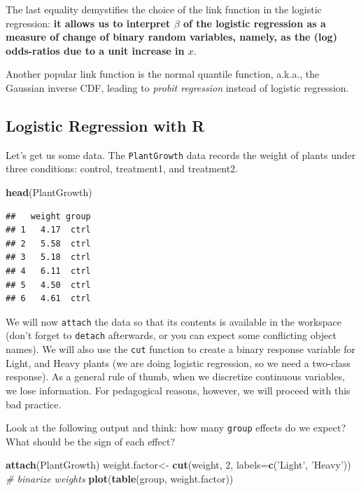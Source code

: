 \documentclass[]{book}
\newenvironment{Shaded}{\begin{snugshade}}{\end{snugshade}}
\newcommand{\KeywordTok}[1]{\textcolor[rgb]{0.13,0.29,0.53}{\textbf{#1}}}
\newcommand{\DataTypeTok}[1]{\textcolor[rgb]{0.13,0.29,0.53}{#1}}
\newcommand{\DecValTok}[1]{\textcolor[rgb]{0.00,0.00,0.81}{#1}}
\newcommand{\StringTok}[1]{\textcolor[rgb]{0.31,0.60,0.02}{#1}}
\newcommand{\CommentTok}[1]{\textcolor[rgb]{0.56,0.35,0.01}{\textit{#1}}}
\newcommand{\NormalTok}[1]{#1}
\theoremstyle{definition}
\theoremstyle{definition}
\theoremstyle{definition}
\theoremstyle{remark}
\let\BeginKnitrBlock\begin \let\EndKnitrBlock\end
\begin{document}
The last equality demystifies the choice of the link function in the
logistic regression: \textbf{it allows us to interpret \(\beta\) of the
logistic regression as a measure of change of binary random variables,
namely, as the (log) odds-ratios due to a unit increase in \(x\)}.

\BeginKnitrBlock{remark}
{}Another popular link function is the normal
quantile function, a.k.a., the Gaussian inverse CDF, leading to
\emph{probit regression} instead of logistic regression.
\EndKnitrBlock{remark}

\subsection{Logistic Regression with
R}\label{logistic-regression-with-r}

Let's get us some data. The \texttt{PlantGrowth} data records the weight
of plants under three conditions: control, treatment1, and treatment2.

\begin{Shaded}
\begin{Highlighting}[]
\KeywordTok{head}\NormalTok{(PlantGrowth)}
\end{Highlighting}
\end{Shaded}

\begin{verbatim}
##   weight group
## 1   4.17  ctrl
## 2   5.58  ctrl
## 3   5.18  ctrl
## 4   6.11  ctrl
## 5   4.50  ctrl
## 6   4.61  ctrl
\end{verbatim}

We will now \texttt{attach} the data so that its contents is available
in the workspace (don't forget to \texttt{detach} afterwards, or you can
expect some conflicting object names). We will also use the \texttt{cut}
function to create a binary response variable for Light, and Heavy
plants (we are doing logistic regression, so we need a two-class
response). As a general rule of thumb, when we discretize continuous
variables, we lose information. For pedagogical reasons, however, we
will proceed with this bad practice.

Look at the following output and think: how many \texttt{group} effects
do we expect? What should be the sign of each effect?

\begin{Shaded}
\begin{Highlighting}[]
\KeywordTok{attach}\NormalTok{(PlantGrowth)}
\NormalTok{weight.factor<-}\StringTok{ }\KeywordTok{cut}\NormalTok{(weight, }\DecValTok{2}\NormalTok{, }\DataTypeTok{labels=}\KeywordTok{c}\NormalTok{(}\StringTok{'Light'}\NormalTok{, }\StringTok{'Heavy'}\NormalTok{)) }\CommentTok{# binarize weights}
\KeywordTok{plot}\NormalTok{(}\KeywordTok{table}\NormalTok{(group, weight.factor))}
\end{Highlighting}
\end{Shaded}
\end{document}
